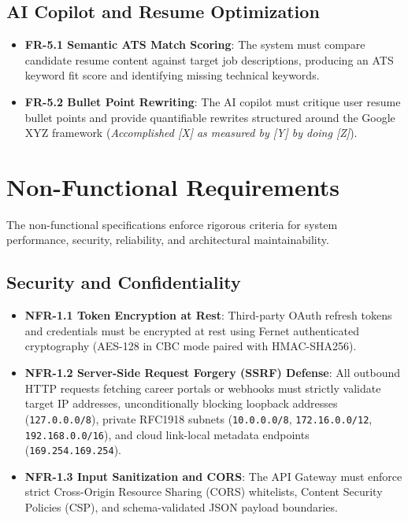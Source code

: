 \subsection{AI Copilot and Resume Optimization}
\begin{itemize}
    \item \textbf{FR-5.1 Semantic ATS Match Scoring}: The system must compare candidate resume content against target job descriptions, producing an ATS keyword fit score and identifying missing technical keywords.
    \item \textbf{FR-5.2 Bullet Point Rewriting}: The AI copilot must critique user resume bullet points and provide quantifiable rewrites structured around the Google XYZ framework (\textit{Accomplished [X] as measured by [Y] by doing [Z]}).
\end{itemize}

\section{Non-Functional Requirements}
The non-functional specifications enforce rigorous criteria for system performance, security, reliability, and architectural maintainability.

\subsection{Security and Confidentiality}
\begin{itemize}
    \item \textbf{NFR-1.1 Token Encryption at Rest}: Third-party OAuth refresh tokens and credentials must be encrypted at rest using Fernet authenticated cryptography (AES-128 in CBC mode paired with HMAC-SHA256).
    \item \textbf{NFR-1.2 Server-Side Request Forgery (SSRF) Defense}: All outbound HTTP requests fetching career portals or webhooks must strictly validate target IP addresses, unconditionally blocking loopback addresses (\texttt{127.0.0.0/8}), private RFC1918 subnets (\texttt{10.0.0.0/8}, \texttt{172.16.0.0/12}, \texttt{192.168.0.0/16}), and cloud link-local metadata endpoints (\texttt{169.254.169.254}).
    \item \textbf{NFR-1.3 Input Sanitization and CORS}: The API Gateway must enforce strict Cross-Origin Resource Sharing (CORS) whitelists, Content Security Policies (CSP), and schema-validated JSON payload boundaries.
\end{itemize}


